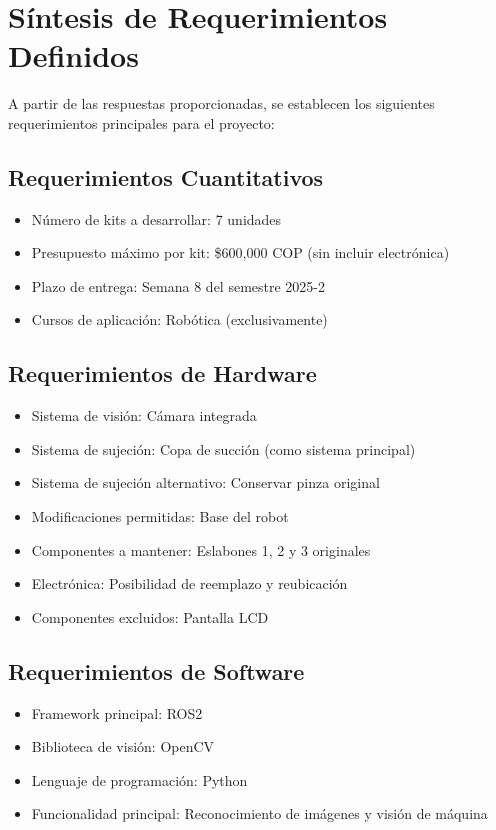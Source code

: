 \section{Síntesis de Requerimientos Definidos}

A partir de las respuestas proporcionadas, se establecen los siguientes requerimientos principales para el proyecto:

\subsection{Requerimientos Cuantitativos}
\begin{itemize}
    \item Número de kits a desarrollar: 7 unidades
    \item Presupuesto máximo por kit: \$600,000 COP (sin incluir electrónica)
    \item Plazo de entrega: Semana 8 del semestre 2025-2
    \item Cursos de aplicación: Robótica (exclusivamente)
\end{itemize}

\subsection{Requerimientos de Hardware}
\begin{itemize}
    \item Sistema de visión: Cámara integrada
    \item Sistema de sujeción: Copa de succión (como sistema principal)
    \item Sistema de sujeción alternativo: Conservar pinza original
    \item Modificaciones permitidas: Base del robot
    \item Componentes a mantener: Eslabones 1, 2 y 3 originales
    \item Electrónica: Posibilidad de reemplazo y reubicación
    \item Componentes excluidos: Pantalla LCD
\end{itemize}

\subsection{Requerimientos de Software}
\begin{itemize}
    \item Framework principal: ROS2
    \item Biblioteca de visión: OpenCV
    \item Lenguaje de programación: Python
    \item Funcionalidad principal: Reconocimiento de imágenes y visión de máquina
\end{itemize}

